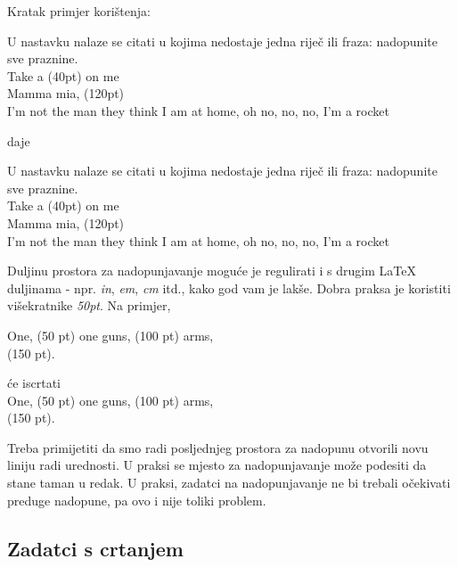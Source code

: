 \documentclass{studosi-workbook}
\begin{document}
	Kratak primjer korištenja:
	
	\begin{kod}
	\begin{zadatak}
		U nastavku nalaze se citati u kojima nedostaje jedna riječ ili fraza: nadopunite sve praznine. \\
		
		Take a \nadopuna(40pt) on me \\
		Mamma mia, \nadopuna(120pt) \\
		I'm not the man they think I am at home, oh no, no, no, I'm a rocket \nadopuna
	\end{zadatak}
	\end{kod}

	daje
	
	\begin{zadatak}
		U nastavku nalaze se citati u kojima nedostaje jedna riječ ili fraza: nadopunite sve praznine. \\
		
		Take a \nadopuna(40pt) on me \\
		Mamma mia, \nadopuna(120pt) \\
		I'm not the man they think I am at home, oh no, no, no, I'm a rocket \nadopuna
	\end{zadatak}
	\vspace*{20pt}
	
	Duljinu prostora za nadopunjavanje moguće je regulirati i s drugim LaTeX duljinama - npr. \textit{in}, \textit{em}, \textit{cm} itd., kako god vam je lakše. Dobra praksa je koristiti višekratnike \textit{50pt}. Na primjer,
	
	\begin{kod}
	One, \nadopuna(50 pt) one guns, \nadopuna(100 pt) arms, \\
	\nadopuna(150 pt).
	\end{kod}

	će iscrtati \\
	
	One, \nadopuna(50 pt) one guns, \nadopuna(100 pt) arms, \\
	\nadopuna(150 pt).
	\vspace*{20pt}
	
	Treba primijetiti da smo radi posljednjeg prostora za nadopunu otvorili novu liniju radi urednosti. U praksi se mjesto za nadopunjavanje može podesiti da stane taman u redak. U praksi, zadatci na nadopunjavanje ne bi trebali očekivati preduge nadopune, pa ovo i nije toliki problem.
	
	\subsection{Zadatci s crtanjem}
	
\end{document}
